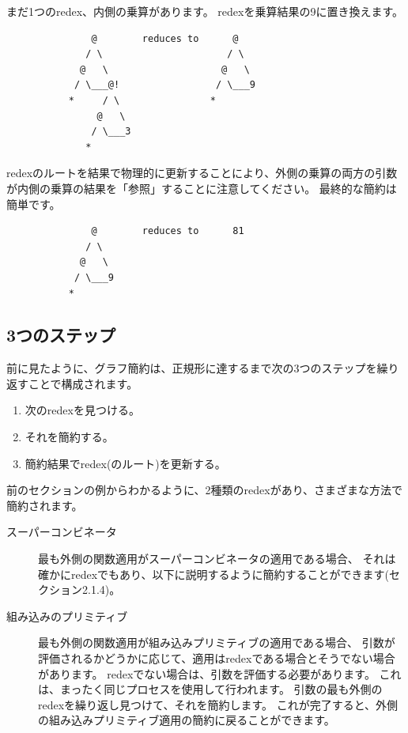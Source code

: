 \documentclass{jbook}
\begin{document}
まだ1つのredex、内側の乗算があります。
redexを乗算結果の9に置き換えます。

\begin{verbatim}
               @        reduces to      @
              / \                      / \
             @   \                    @   \
            / \___@!                 / \___9
           *     / \                *
                @   \
               / \___3
              *
\end{verbatim}

redexのルートを結果で物理的に更新することにより、外側の乗算の両方の引数が内側の乗算の結果を「参照」することに注意してください。
最終的な簡約は簡単です。

\begin{verbatim}
               @        reduces to      81
              / \
             @   \
            / \___9
           *
\end{verbatim}

\subsection{3つのステップ}

前に見たように、グラフ簡約は、正規形に達するまで次の3つのステップを繰り返すことで構成されます。

\begin{enumerate}
	\item 次のredexを見つける。
	\item それを簡約する。
	\item 簡約結果でredex(のルート)を更新する。
\end{enumerate}

前のセクションの例からわかるように、2種類のredexがあり、さまざまな方法で簡約されます。

\begin{description}
	\item[スーパーコンビネータ] 最も外側の関数適用がスーパーコンビネータの適用である場合、
		それは確かにredexでもあり、以下に説明するように簡約することができます(セクション2.1.4)。
	\item[組み込みのプリミティブ] 最も外側の関数適用が組み込みプリミティブの適用である場合、
		引数が評価されるかどうかに応じて、適用はredexである場合とそうでない場合があります。
		redexでない場合は、引数を評価する必要があります。
		これは、まったく同じプロセスを使用して行われます。
		引数の最も外側のredexを繰り返し見つけて、それを簡約します。
		これが完了すると、外側の組み込みプリミティブ適用の簡約に戻ることができます。
\end{description}
\end{document}
